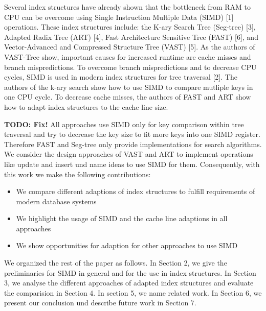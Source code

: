 \documentclass[conference]{IEEEtran}
\begin{document}
Several index structures have already shown that the bottleneck from RAM to CPU can be overcome using Single Instruction Multiple Data (SIMD) [1] operations. These index structures include: the K-ary Search Tree (Seg-tree) [3], Adapted Radix Tree (ART) [4], Fast Architecture Sensitive Tree (FAST) [6], and Vector-Advanced and Compressed Structure Tree (VAST) [5]. As the authors of VAST-Tree show, important causes for increased runtime are cache misses and branch mispredictions. To overcome branch mispredictions and to decrease CPU cycles, SIMD  is used in modern index structures for tree traversal [2]. The authors of the k-ary search show how to use SIMD to compare mutliple keys in one CPU cycle. To decrease cache misses, the authors of FAST and ART show how to adapt index structures to the cache line size.  

\textbf{TODO: Fix!} All approaches use SIMD only for key comparison within tree traversal and try to decrease the key size to fit more keys into one SIMD register. Therefore FAST and Seg-tree only provide implementations for search algorithms. We consider the design approaches of VAST and ART to implement operations like update and insert und name ideas to use SIMD for them. Consequently, with this work we make the following contributions:
\begin{itemize}
	\item We compare different adaptions of index structures to fulfill requirements of modern database systems
	\item We highlight the usage of SIMD and the cache line adaptions in all approaches
	\item We show opportunities for adaption for other approaches to use SIMD
\end{itemize}
We organized the rest of the paper as follows. In Section 2, we give the preliminaries for SIMD in general and for the use in index structures. In Section 3, we analyse the different approaches of adapted index structures and evaluate the comparision in Section 4. In section 5, we name related work. In Section 6, we present our conclusion und describe future work in Section 7. 
\end{document}
